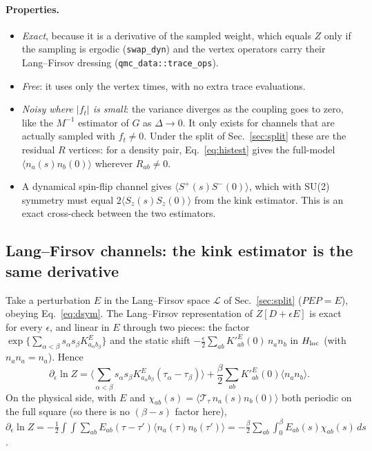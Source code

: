 \documentclass[a4paper,12pt]{article}
\newcommand{\aver}[1]{\ensuremath{\langle#1\rangle}}
\renewcommand{\t}{\ensuremath{\tau}}
\newcommand{\TT}{\ensuremath{\mathcal{T}_\t}}
\newcommand{\Hloc}{\ensuremath{H_{\rm loc}}}
\begin{document}
\paragraph{Properties.}
\begin{itemize}
  \item \emph{Exact}, because it is a derivative of the sampled weight, which equals $Z$
    only if the sampling is ergodic (\texttt{swap\_dyn}) and the vertex operators carry
    their Lang--Firsov dressing (\texttt{qmc\_data::trace\_ops}).
  \item \emph{Free}: it uses only the vertex times, with no extra trace evaluations.
  \item \emph{Noisy where $|f_t|$ is small}: the variance diverges as the coupling goes
    to zero, like the $M^{-1}$ estimator of $G$ as $\Delta\to0$. It only exists for
    channels that are actually sampled with $f_t\neq0$. Under the split of
    Sec.~\ref{sec:split} these are the residual $R$ vertices: for a density pair,
    Eq.~\eqref{eq:histest} gives the full-model $\aver{n_a(s)n_b(0)}$ wherever
    $R_{ab}\neq0$.
  \item A dynamical spin-flip channel gives $\aver{S^+(s)S^-(0)}$, which with SU(2)
    symmetry must equal $2\aver{S_z(s)S_z(0)}$ from the kink estimator. This is an
    exact cross-check between the two estimators.
\end{itemize}

\subsection{Lang--Firsov channels: the kink estimator is the same derivative}
\label{sec:kink-derivative}

Take a perturbation $E$ in the Lang--Firsov space $\mathcal L$ of Sec.~\ref{sec:split}
($PEP=E$), obeying Eq.~\eqref{eq:dsym}. The Lang--Firsov representation of
$Z[D+\epsilon E]$ is exact for every $\epsilon$, and linear in $E$ through two pieces:
the factor $\exp\{\sum_{\alpha<\beta}s_\alpha s_\beta K^E_{a_\alpha b_\beta}\}$ and the
static shift $-\tfrac\epsilon2\sum_{ab}K'^E_{ab}(0)\,n_an_b$ in $\Hloc$ (with
$n_an_a=n_a$). Hence
\[
  \partial_\epsilon\ln Z=\aver{\sum_{\alpha<\beta}s_\alpha s_\beta
  K^E_{a_\alpha b_\beta}(\t_\alpha-\t_\beta)}
  +\frac\beta2\sum_{ab}K'^E_{ab}(0)\aver{n_an_b}.
\]
On the physical side, with $E$ and $\chi_{ab}(s)=\aver{\TT\,n_a(s)n_b(0)}$ both periodic
on the full square (so there is no $(\beta-s)$ factor here),
$\partial_\epsilon\ln Z=-\tfrac12\int\!\!\int\sum_{ab}E_{ab}(\t-\t')\aver{n_a(\t)n_b(\t')}
=-\tfrac\beta2\sum_{ab}\int_0^\beta E_{ab}(s)\chi_{ab}(s)\,ds$.
\end{document}
